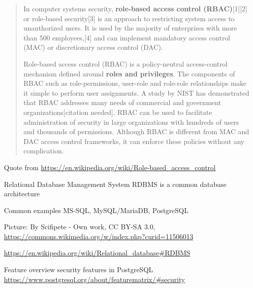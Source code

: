\documentclass[Screen16to9,17pt]{foils}
\begin{document}
\begin{quote}
In computer systems security, {\bf role-based access control (RBAC)}[1][2] or role-based security[3] is an approach to restricting system access to unauthorized users. It is used by the majority of enterprises with more than 500 employees,[4] and can implement mandatory access control (MAC) or discretionary access control (DAC).

Role-based access control (RBAC) is a policy-neutral access-control mechanism defined around {\bf roles and privileges}. The components of RBAC such as role-permissions, user-role and role-role relationships make it simple to perform user assignments. A study by NIST has demonstrated that RBAC addresses many needs of commercial and government organizations[citation needed]. RBAC can be used to facilitate administration of security in large organizations with hundreds of users and thousands of permissions. Although RBAC is different from MAC and DAC access control frameworks, it can enforce these policies without any complication.
\end{quote}
Quote from \url{https://en.wikipedia.org/wiki/Role-based_access_control}



\begin{list1}
\item Relational Database Management System RDBMS is a common database architecture
\item Common examples MS-SQL, MySQL/MariaDB, PostgreSQL
\item Picture: By Scifipete - Own work, CC BY-SA 3.0,\\ \url{https://commons.wikimedia.org/w/index.php?curid=11506013}
\item \url{https://en.wikipedia.org/wiki/Relational_database#RDBMS}
\end{list1}


Feature overview security features in PostgreSQL\\
\url{https://www.postgresql.org/about/featurematrix/#security}

\end{document}
